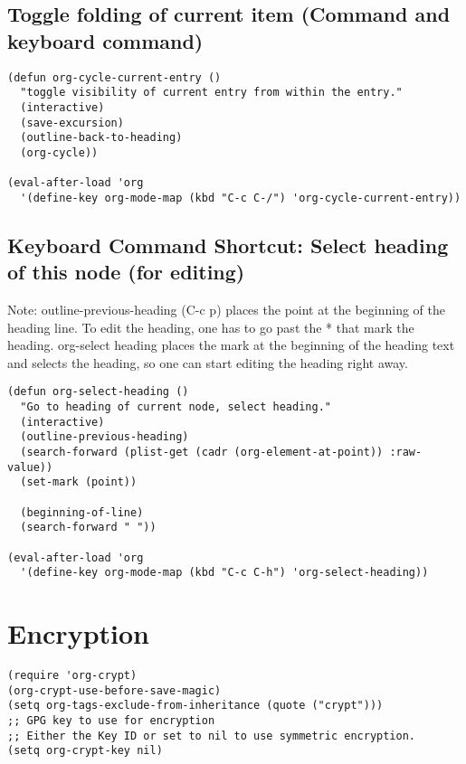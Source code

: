 \documentclass[10pt]{article}
\begin{document}
\subsection{Toggle folding of current item (Command and keyboard command)}
\label{sec-14-3}

\begin{verbatim}
(defun org-cycle-current-entry ()
  "toggle visibility of current entry from within the entry."
  (interactive)
  (save-excursion)
  (outline-back-to-heading)
  (org-cycle))

(eval-after-load 'org
  '(define-key org-mode-map (kbd "C-c C-/") 'org-cycle-current-entry))
\end{verbatim}

\subsection{Keyboard Command Shortcut: Select heading of this node (for editing)}
\label{sec-14-4}

Note: outline-previous-heading (C-c p) places the point at the beginning of the heading line.  To edit the heading, one has to go past the * that mark the heading.  org-select heading places the mark at the beginning of the heading text and selects the heading, so one can start editing the heading right away.

\begin{verbatim}
(defun org-select-heading ()
  "Go to heading of current node, select heading."
  (interactive)
  (outline-previous-heading)
  (search-forward (plist-get (cadr (org-element-at-point)) :raw-value))
  (set-mark (point))

  (beginning-of-line)
  (search-forward " "))

(eval-after-load 'org
  '(define-key org-mode-map (kbd "C-c C-h") 'org-select-heading))
\end{verbatim}

\section{Encryption}
\label{sec-15}

\begin{verbatim}
(require 'org-crypt)
(org-crypt-use-before-save-magic)
(setq org-tags-exclude-from-inheritance (quote ("crypt")))
;; GPG key to use for encryption
;; Either the Key ID or set to nil to use symmetric encryption.
(setq org-crypt-key nil)
\end{verbatim}
\end{document}
